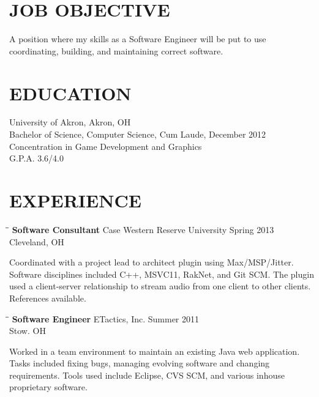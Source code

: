 \documentclass{res}
\begin{document}
 


\address{\bf  PRESENT ADDRESS\\10325 Frazeysburg Rd.\\Dresden, OH 43821\\(740) 586-8749\\www.rossrothenstine.com}
\begin{resume}

\section{JOB OBJECTIVE}          
    A position where my skills as a Software Engineer will be put to use coordinating, building,
    and maintaining correct software.        
 
\section{EDUCATION}          
    University of Akron, Akron, OH  \\        
    Bachelor of Science, Computer Science, Cum Laude, December 2012   \\       
    Concentration in Game Development and Graphics       \\           
    G.P.A. 3.6/4.0          

 
\section{EXPERIENCE}
   \vspace{-0.1in}	
   \begin{tabbing}
   \hspace{2.3in}\= \hspace{2.6in}\= \kill %
    {\bf Software Consultant} \>Case Western Reserve University    \>Spring 2013\\
                             \>Cleveland, OH
   \end{tabbing}\vspace{-20pt}      %
    Coordinated with a project lead to architect plugin using Max/MSP/Jitter. Software 
    disciplines included C++, MSVC11, RakNet, and Git SCM. The plugin used a client-server relationship to stream audio from one client to other clients. References available. 
   \begin{tabbing}
   \hspace{2.3in}\= \hspace{2.6in}\= \kill %
    {\bf Software Engineer} \> ETactics, Inc. \> Summer 2011\\
                          \>Stow. OH
   \end{tabbing}\vspace{-20pt}
    Worked in a team environment to maintain an existing Java web application. Tasks included
    fixing bugs, managing evolving software and changing requirements. Tools used include Eclipse,
    CVS SCM, and various inhouse proprietary software.



\end{resume}
\end{document}
